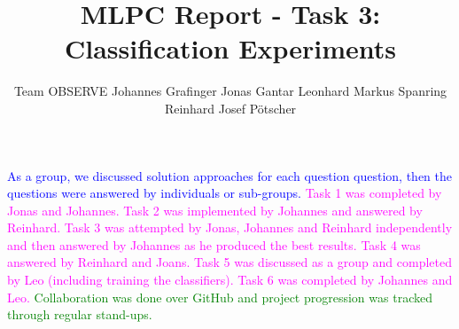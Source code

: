 \documentclass{article}
\title{MLPC Report  - Task 3: Classification Experiments}
\author{
  Team OBSERVE \AND
  Johannes Grafinger 
  \And
  Jonas Gantar 
  \And 
  Leonhard Markus Spanring 
  \And 
  Reinhard Josef Pötscher
}
\begin{document}
\maketitle

\begin{contributions}
  \textcolor{blue}{As a group, we discussed solution approaches for each question question, then the questions were answered by individuals or sub-groups.} 
  \textcolor{magenta}{Task 1 was completed by Jonas and Johannes. Task 2 was implemented by Johannes and answered by Reinhard. Task 3 was attempted by Jonas, Johannes and Reinhard independently and then answered by Johannes as he produced the best results. Task 4 was answered by Reinhard and Joans. Task 5 was discussed as a group and completed by Leo (including training the classifiers). Task 6 was completed by Johannes and Leo.} 
  \textcolor{green}{Collaboration was done over GitHub and project progression was tracked through regular stand-ups.} 
\end{contributions}












\end{document}
